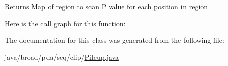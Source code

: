 \begin{DoxyReturn}{Returns}
Map of region to scan P value for each position in region 
\end{DoxyReturn}


Here is the call graph for this function\+:




The documentation for this class was generated from the following file\+:\begin{DoxyCompactItemize}
\item 
java/broad/pda/seq/clip/\hyperlink{_pileup_8java}{Pileup.\+java}\end{DoxyCompactItemize}

